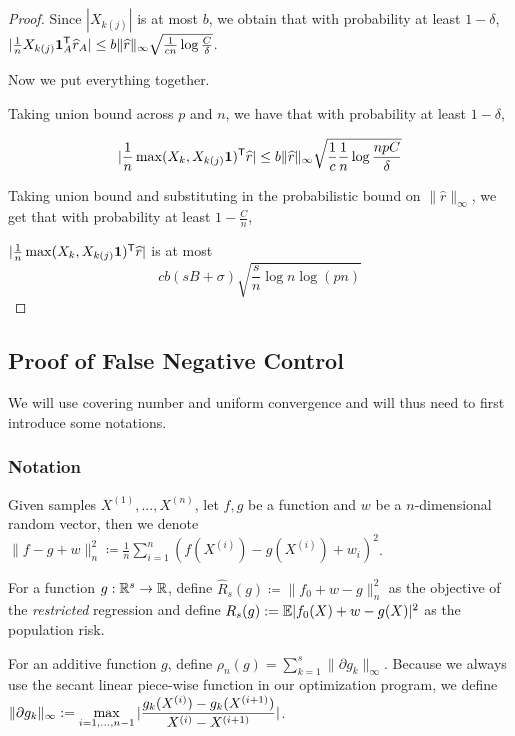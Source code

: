 \begin{proof}
Since $|X_{k(j)}|$ is at most $b$, we obtain that with probability at least $1-\delta$, $| \frac{1}{n} X_{k(j)} \mbox{\boldmath $1$}_A^{\mathsf{T}} \widehat{r}_A| \leq b\| \widehat{r} \|_\infty \sqrt{ \frac{1}{cn} \log \frac{C}{\delta}}$.

Now we put everything together.

Taking union bound across $p$ and $n$, we have that with probability at least $1-\delta$, 

\[
| \frac{1}{n} \max(X_k, X_{k(j)}\mbox{\boldmath $1$})^{\mathsf{T}} \widehat{r}| \leq b \|\widehat{r}\|_\infty \sqrt{ \frac{1}{c} \frac{1}{n} \log \frac{np C }{\delta}}
\]

Taking union bound and substituting in the probabilistic bound on $\|\hat{r}\|_\infty$, we get that with probability at least $1-\frac{C}{n}$,

$| \frac{1}{n} \max(X_k, X_{k(j)}\mbox{\boldmath $1$})^{\mathsf{T}} \widehat{r}|$ is at most 
\[
 c b (sB + \sigma) \sqrt{ \frac{s}{n} \log n \log (pn) }
\]

\end{proof}

 
 
 
 
 
 \subsection{Proof of False Negative Control}
 \label{sec:false_negative_proof}
 
 We will use covering number and uniform convergence and will thus need to first introduce some notations. 
 \subsubsection{Notation}
 
 Given samples $X^{(1)},...,X^{(n)}$, let $f, g$ be a function and $w$ be a $n$-dimensional random vector, then we denote $\| f - g + w \|_n^2 \coloneqq \frac{1}{n} \sum_{i=1}^n ( f(X^{(i)}) - g(X^{(i)}) + w_i )^2$.

For a function $g : {\mathbb R}^s \rightarrow {\mathbb R}$, define $\hat{R}_s(g) \coloneqq \| f_0 + w - g \|_n^2$ as the objective of the \emph{restricted} regression and define $R_s(g) := {\mathbb E} | f_0(X)  + w - g(X) |^2$ as the population risk.

For an additive function $g$, define $\rho_n(g) = \sum_{k=1}^s \| \partial g_k \|_\infty$. Because we always use the secant linear piece-wise function in our optimization program, we define $\displaystyle \| \partial g_k\|_\infty := \max_{i=1,...,n-1} |\frac{ g_k(X^{(i)}) - g_k(X^{(i+1)})}{ X^{(i)} - X^{(i+1)}}|$.

